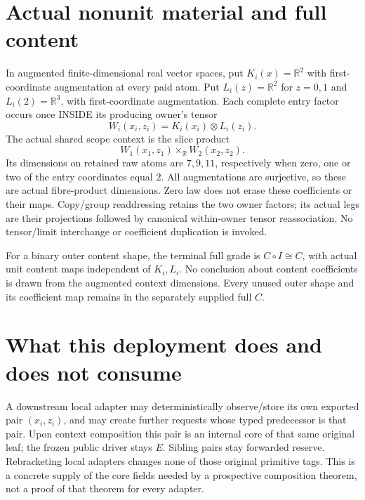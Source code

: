 \documentclass[11pt]{article}
\begin{document}
\section{Actual nonunit material and full content}
In augmented finite-dimensional real vector spaces, put $K_i(x)=\mathbb R^2$ with first-coordinate augmentation at every paid atom. Put $L_i(z)=\mathbb R^2$ for $z=0,1$ and $L_i(2)=\mathbb R^3$, with first-coordinate augmentation. Each complete entry factor occurs once INSIDE its producing owner's tensor
\[
 W_i(x_i,z_i)=K_i(x_i)\otimes L_i(z_i).
\]
The actual shared scope context is the slice product
\[
             W_1(x_1,z_1)\times_{\mathbb R}W_2(x_2,z_2).
\]
Its dimensions on retained raw atoms are $7,9,11$, respectively when zero, one or two of the entry coordinates equal $2$. All augmentations are surjective, so these are actual fibre-product dimensions. Zero law does not erase these coefficients or their maps. Copy/group readdressing retains the two owner factors; its actual legs are their projections followed by canonical within-owner tensor reassociation. No tensor/limit interchange or coefficient duplication is invoked.

For a binary outer content shape, the terminal full grade is $C\circ I\cong C$, with actual unit content maps independent of $K_i,L_i$. No conclusion about content coefficients is drawn from the augmented context dimensions. Every unused outer shape and its coefficient map remains in the separately supplied full $C$.

\section{What this deployment does and does not consume}
A downstream local adapter may deterministically observe/store its own exported pair $(x_i,z_i)$, and may create further requests whose typed predecessor is that pair. Upon context composition this pair is an internal core of that same original leaf; the frozen public driver stays $E$. Sibling pairs stay forwarded reserve. Rebracketing local adapters changes none of those original primitive tags. This is a concrete supply of the core fields needed by a prospective composition theorem, not a proof of that theorem for every adapter.
\end{document}
